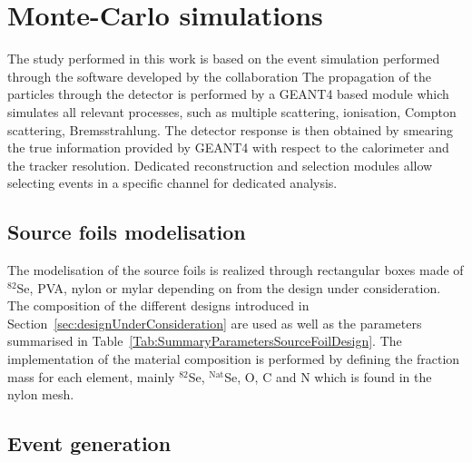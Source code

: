 \documentclass[main.tex]{subfiles}
\begin{document}
\FloatBarrier


\section{Monte-Carlo simulations}\label{sec:MCsimulations}


\NI The study performed in this work is based on the event simulation performed through the software developed by the collaboration The propagation of the particles through the detector is performed by a GEANT4 based module which simulates all relevant processes, such as multiple scattering, ionisation, Compton scattering, Bremsstrahlung. The detector response is then obtained by smearing the true information provided by GEANT4 with respect to the calorimeter and the tracker resolution. Dedicated reconstruction and selection modules allow selecting events in a specific channel for dedicated analysis.


\bigskip




\subsection{Source foils modelisation}


\NI The modelisation of the source foils is realized through rectangular boxes made of $^{\text{82}}$Se, PVA, nylon or mylar depending on from the design under consideration. The composition of the different designs introduced in Section~\ref{sec:designUnderConsideration} are used as well as the parameters summarised in Table~\ref{Tab:SummaryParametersSourceFoilDesign}. The implementation of the material composition is performed by defining the fraction mass for each element, mainly $^{\text{82}}$Se, $^{\text{Nat}}$Se, O, C and N which is found in the nylon mesh.


\subsection{Event generation}
\end{document}
